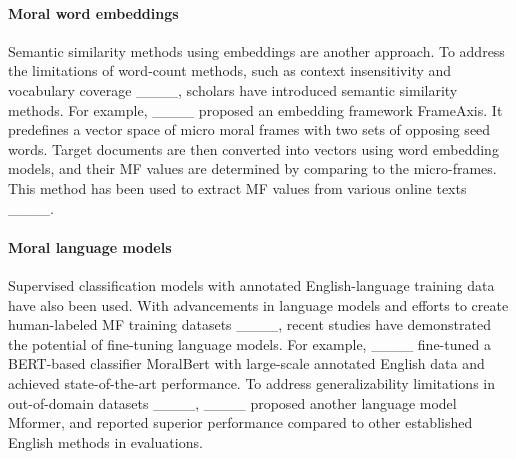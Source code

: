 \paragraph{Moral word embeddings} 
Semantic similarity methods using embeddings are another approach. To address the limitations of word-count methods, such as context insensitivity and vocabulary coverage ____, scholars have introduced semantic similarity methods. For example, ____ proposed an embedding framework FrameAxis. It predefines a vector space of micro moral frames with two sets of opposing seed words. Target documents are then converted into vectors using word embedding models, and their MF values are determined by comparing to the micro-frames. This method has been used to extract MF values from various online texts ____. %

\paragraph{Moral language models} 
Supervised classification models with annotated English-language training data have also been used. With advancements in language models and efforts to create human-labeled MF training datasets ____, recent studies have demonstrated the potential of fine-tuning language models. For example, ____ fine-tuned a BERT-based classifier MoralBert with large-scale annotated English data and achieved state-of-the-art performance. To address generalizability limitations in out-of-domain datasets ____, ____ proposed another language model Mformer, and reported superior performance compared to other established English methods in evaluations. 


